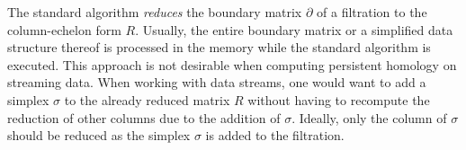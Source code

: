 \documentclass[11pt]{article}
\begin{document}
The standard algorithm \cite{edelsbrunner-00, zomorodian-05} \emph{reduces} the boundary matrix 
$\partial$ of a filtration \cite{zomorodian-10} to the column-echelon form $R$.  Usually, the 
entire boundary matrix or a simplified data structure thereof is processed in the memory while the 
standard algorithm is executed.  This approach is not desirable when computing persistent homology 
on streaming data.  When working with data streams, one would want to add a simplex $\sigma$ to the 
already reduced matrix $R$ without having to recompute the reduction of other columns due to the 
addition of $\sigma$.  Ideally, only the column of $\sigma$ should be reduced as the simplex 
$\sigma$ is added to the filtration.





\end{document}
